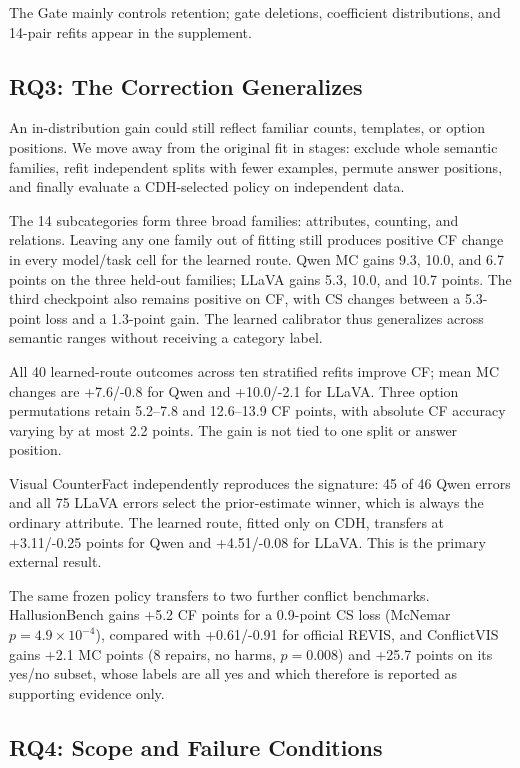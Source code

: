 \documentclass[letterpaper]{article}
\begin{document}
The Gate mainly controls retention; gate deletions, coefficient
distributions, and 14-pair refits appear in the supplement.

\subsection{RQ3: The Correction Generalizes}

An in-distribution gain could still reflect familiar counts, templates, or
option positions. We move away from the original fit in stages:
exclude whole semantic families, refit independent splits with fewer examples,
permute answer positions, and finally evaluate a CDH-selected policy on
independent data.

The 14 subcategories form three broad families: attributes, counting, and
relations. Leaving any one family out of fitting still produces positive CF
change in every model/task cell for the learned route. Qwen MC gains
9.3, 10.0, and 6.7 points on the three held-out families; LLaVA gains 5.3,
10.0, and 10.7 points. The third checkpoint also remains positive on CF, with
CS changes between a 5.3-point loss and a 1.3-point gain. The learned calibrator
thus generalizes across semantic ranges without receiving a category label.

All 40 learned-route outcomes across ten stratified refits improve CF; mean MC changes are
+7.6/-0.8 for Qwen and +10.0/-2.1 for LLaVA. Three option permutations retain
5.2--7.8 and 12.6--13.9 CF points, with absolute CF accuracy varying by at most
2.2 points. The gain is not tied to one split or answer position.

Visual CounterFact independently reproduces the signature: 45 of 46 Qwen
errors and all 75 LLaVA errors select the prior-estimate winner, which is always the
ordinary attribute. The learned route, fitted only on CDH, transfers
at +3.11/-0.25 points for Qwen and +4.51/-0.08 for LLaVA.
This is the primary external result.

The same frozen policy transfers to two further conflict benchmarks.
HallusionBench gains +5.2 CF points for a 0.9-point CS loss (McNemar
$p=4.9\times10^{-4}$), compared with +0.61/-0.91 for official REVIS, and
ConflictVIS gains +2.1 MC points (8 repairs, no harms, $p=0.008$) and +25.7
points on its yes/no subset, whose labels are all yes and which therefore
is reported as supporting evidence only.

\subsection{RQ4: Scope and Failure Conditions}
\end{document}

